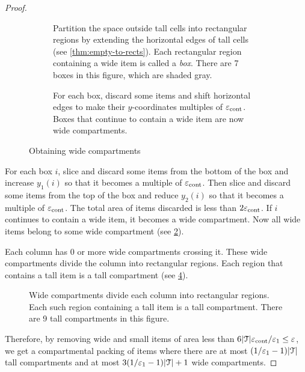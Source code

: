 \begin{proof}
\begin{figure}[!htb]
\begin{subfigure}[t]{0.45\textwidth}
\centering

\caption{Partition the space outside tall cells into rectangular regions by
extending the horizontal edges of tall cells (see \cref{thm:empty-to-rects}).
Each rectangular region containing a wide item is called a \emph{box}.
There are 7 boxes in this figure, which are shaded gray.}
\label{fig:compartmentalize:boxes}
\end{subfigure}
\hfill
\begin{subfigure}[t]{0.45\textwidth}
\centering

\caption{For each box, discard some items and shift horizontal edges
to make their $y$-coordinates multiples of $\varepsilon_{\mathrm{cont}}$.
Boxes that continue to contain a wide item are now wide compartments.}
\label{fig:compartmentalize:boxes2}
\end{subfigure}
\caption{Obtaining wide compartments}
\label{fig:compartmentalize-2}
\end{figure}

For each box $i$, slice and discard some items from the bottom of the box
and increase $y_1(i)$ so that it becomes a multiple of $\varepsilon_{\mathrm{cont}}$.
Then slice and discard some items from the top of the box
and reduce $y_2(i)$ so that it becomes a multiple of $\varepsilon_{\mathrm{cont}}$.
The total area of items discarded is less than $2\varepsilon_{\mathrm{cont}}$.
If $i$ continues to contain a wide item, it becomes a wide compartment.
Now all wide items belong to some wide compartment
(see \cref{fig:compartmentalize:boxes2}).

Each column has 0 or more wide compartments crossing it.
These wide compartments divide the column into rectangular regions.
Each region that contains a tall item is a tall compartment
(see \cref{fig:compartmentalize-3}).

\begin{figure}[!htb]
\centering

\caption[Obtaining tall compartments]%
{Wide compartments divide each column into rectangular regions.
Each such region containing a tall item is a tall compartment.
There are 9 tall compartments in this figure.}
\label{fig:compartmentalize-3}
\end{figure}

Therefore, by removing wide and small items of area less than
$6|\mathcal{T}|\varepsilon_{\mathrm{cont}}/\varepsilon_1 \le \varepsilon$, we get a compartmental packing of items
where there are at most $(1/\varepsilon_1-1)|\mathcal{T}|$ tall compartments
and at most $3(1/\varepsilon_1-1)|\mathcal{T}| + 1$ wide compartments.
\end{proof}


